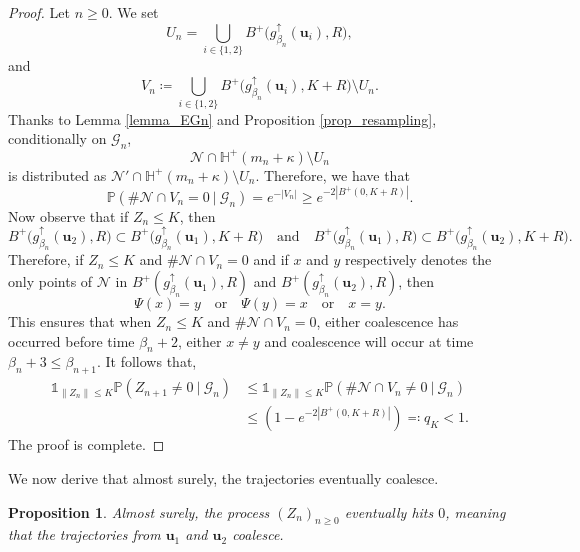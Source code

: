 \documentclass[a4paper, 11pt]{article}
\theoremstyle{plain}
\newtheorem{Proposition}[Theorem]{Proposition}
\theoremstyle{definition}
\renewcommand{\P}{\mathbb{P}}
\numberwithin{equation}{section}
\begin{document}
\begin{proof}
    Let $n\geq 0$. We set
        \[U_n=\bigcup_{i\in\{1,2\}}B^+\big(g_{\beta_n}^\uparrow(\mathbf u_i),R\big),\]
    and
        \[V_n\coloneqq\bigcup_{i\in\{1,2\}}B^+\big(g_{\beta_n}^\uparrow(\mathbf u_i),K+R\big)\setminus U_n.\]
    Thanks to Lemma \ref{lemma_EGn} and Proposition \ref{prop_resampling}, conditionally on $\mathcal G_n$,
        \[\mathcal N\cap\mathbb H^+(m_n+\kappa)\setminus U_n\]
    is distributed as $\mathcal N'\cap\mathbb H^+(m_n+\kappa)\setminus U_n$. Therefore, we have that
        \[\P(\#\mathcal N\cap V_n=0~|~\mathcal G_n)=e^{-|V_n|}\geq e^{-2|B^+(0,K+R)|}.\]
    Now observe that if $Z_n\leq K$, then 
        \[B^+\big(g_{\beta_n}^\uparrow(\mathbf u_2),R\big)\subset B^+\big(g_{\beta_n}^\uparrow(\mathbf u_1),K+R\big)\quad\text{and}\quad B^+\big(g_{\beta_n}^\uparrow(\mathbf u_1),R\big)\subset B^+\big(g_{\beta_n}^\uparrow(\mathbf u_2),K+R\big).\]
    Therefore, if $Z_n\leq K$ and $\#\mathcal N\cap V_n=0$ and if $x$ and $y$ respectively denotes the only points of $\mathcal N$ in $B^+(g_{\beta_n}^\uparrow(\mathbf u_1),R)$ and $B^+(g_{\beta_n}^\uparrow(\mathbf u_2),R)$, then
        \[\Psi(x)=y\quad\text{or}\quad\Psi(y)=x\quad\text{or}\quad x=y.\]
    This ensures that when $Z_n\leq K$ and $\#\mathcal N\cap V_n=0$, either coalescence has occurred before time $\beta_n+2$, either $x\neq y$ and coalescence will occur at time $\beta_n+3\leq\beta_{n+1}$. It follows that,
        \begin{equation*}
            \begin{split}
                \mathds 1_{\|Z_n\|\leq K}\P(Z_{n+1}\neq0~\vert~\mathcal G_n)&\leq\mathds 1_{\|Z_n\|\leq K}\P(\#\mathcal N\cap V_n\neq0~\vert~\mathcal G_n)\\
                &\leq(1-e^{-2|B^+(0,K+R)|})\eqqcolon q_K<1.
            \end{split}
        \end{equation*}
    The proof is complete.
\end{proof}


We now derive that almost surely, the trajectories eventually coalesce.


\begin{Proposition}
    \label{prop_coalescence}
    Almost surely, the process $(Z_n)_{n\geq 0}$ eventually hits $0$, meaning that the trajectories from $\mathbf u_1$ and $\mathbf u_2$ coalesce.
\end{Proposition}
\end{document}
